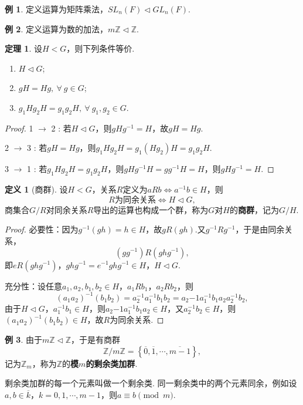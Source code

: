 \documentclass[12pt]{ctexart}
\theoremstyle{definition}
\newtheorem{definition}{定义}
\newtheorem{theorem}{定理}
\newtheorem{example}{例}
\theoremstyle{plain}
\begin{document}
	\begin{example}
		定义运算为矩阵乘法，$SL_n(F)\vartriangleleft GL_n(F)$.
	\end{example}
	\begin{example}
		定义运算为数的加法，$m\mathbb{Z}\vartriangleleft \mathbb{Z}$.
	\end{example}
	\begin{theorem}
		设$H<G$，则下列条件等价.
		\begin{enumerate}
			\item $H\vartriangleleft G$;
			\item $gH=Hg,\ \forall\ g\in G$;
			\item $g_1Hg_2H=g_1g_2H,\ \forall\ g_1,g_2\in G$.
		\end{enumerate}
	\end{theorem}
	\begin{proof}
		1 $\to$ 2 : 若$H\vartriangleleft G$，则$gHg^{-1}=H$，故$gH=Hg$.
		
		2 $\to$ 3 : 若$gH=Hg$，则$g_1Hg_2H=g_1(Hg_2)H=g_1g_2H$.
		
		3 $\to$ 1 : 若$g_1Hg_2H=g_1g_2H$，则$gHg^{-1}H=gg^{-1}H=H$，则$gHg^{-1}=H$.
	\end{proof}
	\begin{definition}[商群]
		设$H<G$，关系$R$定义为$aRb\iff a^{-1}b\in H$，则
		$$R\text{为同余关系}\iff H\vartriangleleft G,$$
		商集合$G/R$对同余关系$R$导出的运算也构成一个群，称为$G$对$H$的\textbf{商群}，记为$G/H$.
	\end{definition}
	\begin{proof}
		必要性：因为$g^{-1}(gh)=h\in H$，故$gR(gh)$.又$g^{-1}Rg^{-1}$，于是由同余关系，$$(gg^{-1})R(ghg^{-1}),$$即$eR(ghg^{-1})$，$ghg^{-1}=e^{-1}ghg^{-1}\in H$，$H\vartriangleleft G$.
		
		充分性：设任意$a_1,a_2,b_1,b_2\in H$，$a_1Rb_1$，$a_2Rb_2$，则
		$$(a_1a_2)^{-1}(b_1b_2)=a_2^{-1}a_1^{-1}b_1b_2=a_2{-1}a_1^{-1}b_1a_2a_2^{-1}b_2,$$
		由于$H\vartriangleleft G$，$a_1^{-1}b_1\in H$，则$a_2{-1}a_1^{-1}b_1a_2\in H$，又$a_2^{-1}b_2\in H$，则$(a_1a_2)^{-1}(b_1b_2)\in H$，故$R$为同余关系.
	\end{proof}
	\begin{example}
		由于$m\mathbb{Z}\vartriangleleft\mathbb{Z}$，于是有商群
		$$\mathbb{Z}/m\mathbb{Z}=\left\{\overline{0},\overline{1},\cdots,\overline{m-1}\right\},$$
		记为$\mathbb{Z}_m$，称为$\mathbb{Z}$的\textbf{模$m$的剩余类加群}.
	\end{example}
	剩余类加群的每一个元素叫做一个剩余类. 同一剩余类中的两个元素同余，例如设$a,b\in\overline{k}$，$k=0,1,\cdots,m-1$，则$a\equiv b\pmod m$. 
\end{document}
